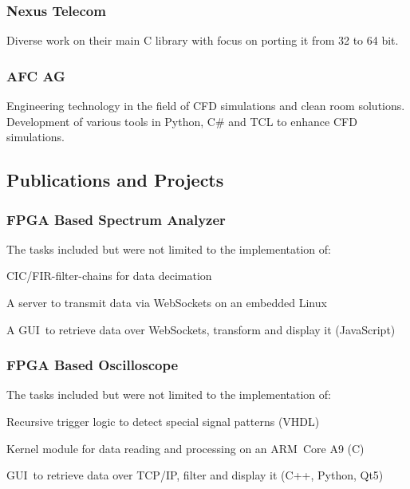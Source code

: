 \documentclass[]{resume}
\begin{document}
\begin{timeline}
\subsubsection{Nexus Telecom}
Diverse work on their main C library with focus on porting it from 32 to 64 bit.
\sectionsep

\subsubsection{AFC AG}
Engineering technology in the field of CFD simulations and clean room solutions.
Development of various tools in Python, C\# and TCL to enhance CFD simulations.
\sectionsep



\subsection{Publications and Projects}

\subsubsection{FPGA Based Spectrum Analyzer}
The tasks included but were not limited to the implementation of:
\begin{tightemize}
\item CIC/FIR-filter-chains for data decimation
\item A server to transmit data via WebSockets on an embedded Linux
\item A GUI to retrieve data over WebSockets, transform and display it (JavaScript)
\end{tightemize}
\sectionsep

\subsubsection{FPGA Based Oscilloscope}
The tasks included but were not limited to the implementation of:
\begin{tightemize}
\item Recursive trigger logic to detect special signal patterns (VHDL)
\item Kernel module for data reading and processing on an ARM Core A9 (C)
\item GUI to retrieve data over TCP/IP, filter and display it (C++, Python, Qt5)
\end{tightemize}
\sectionsep


\end{timeline}
\end{document}
